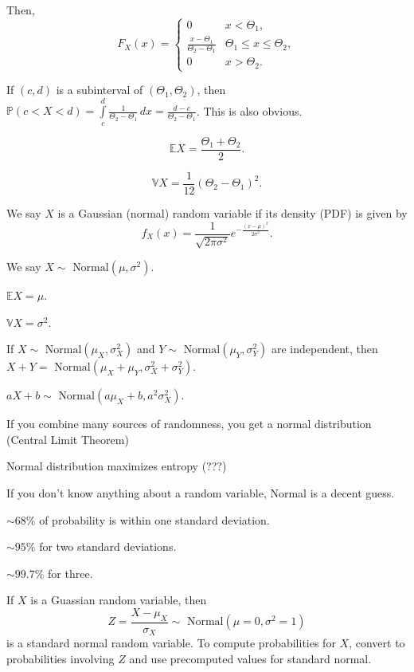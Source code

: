 \documentclass{article}
\begin{document}
    Then, $$F_X(x) = \begin{cases} 0 & x < \Theta_1, \\ \frac{x - \Theta_1}{\Theta_2 - \Theta_1} & \Theta_1 \leq x \leq \Theta_2, \\ 0 & x > \Theta_2. \end{cases}$$

    If $(c,d)$ is a subinterval of $(\Theta_1, \Theta_2)$, then $\mathbb P(c < X < d) = \int\limits_c^d \frac1{\Theta_2 - \Theta_1}\,dx = \frac{d - c}{\Theta_2 - \Theta_1}$. This is also obvious.
    
    $$\mathbb EX = \frac{\Theta_1 + \Theta_2}{2}.$$
    
    $$\mathbb VX = \frac1{12}(\Theta_2 - \Theta_1)^2.$$

\medskip
{}

    We say $X$ is a Gaussian (normal) random variable if its density (PDF) is given by $$f_X(x) = \frac1{\sqrt{2\pi\sigma^2}} e^{-\frac{(x-\mu)^2}{2\sigma^2}}.$$
    
    We say $X \sim \text{ Normal}(\mu, \sigma^2)$.
    
    $\mathbb EX = \mu$.
    
    $\mathbb VX = \sigma^2$.
    
    If $X \sim \text{ Normal}(\mu_X,\sigma_X^2)$ and $Y \sim \text{ Normal}(\mu_Y,\sigma_Y^2)$ are independent, then $X+Y = \text{ Normal}(\mu_X + \mu_Y, \sigma^2_X + \sigma^2_Y)$.
    
    $aX+b \sim \text{ Normal}(a\mu_X+b, a^2\sigma_X^2)$.
    
    If you combine many sources of randomness, you get a normal distribution (Central Limit Theorem)
    
    Normal distribution maximizes entropy (???)
    
    If you don't know anything about a random variable, Normal is a decent guess.
    
    $\sim68\%$ of probability is within one standard deviation. 

    $\sim95\%$ for two standard deviations.
    
    $\sim99.7\%$ for three.
    
\medskip
{}

    If $X$ is a Guassian random variable, then $$Z = \frac{X-\mu_X}{\sigma_X} \sim \text{ Normal}(\mu=0, \sigma^2=1)$$ is a standard normal random variable. To compute probabilities for $X$, convert to probabilities involving $Z$ and use precomputed values for standard normal.
\end{document}
